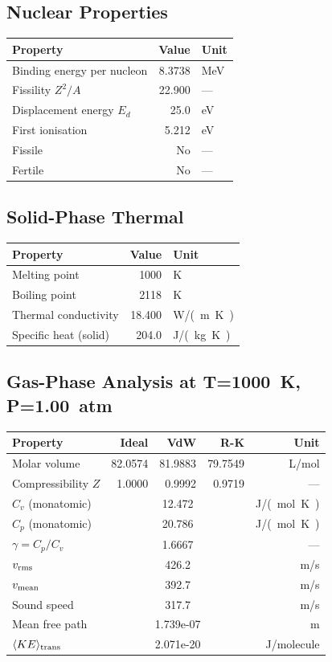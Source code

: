 \documentclass[11pt,a4paper]{article}
\begin{document}
\subsection{Nuclear Properties}
\begin{tabular}{lrl}
  \toprule
  Property & Value & Unit \\
  \midrule
  Binding energy per nucleon & 8.3738 & \si{MeV} \\
  Fissility $Z^2/A$ & 22.900 & --- \\
  Displacement energy $E_d$ & 25.0 & \si{eV} \\
  First ionisation & 5.212 & \si{eV} \\
  Fissile & No & --- \\
  Fertile & No & --- \\
  \bottomrule
\end{tabular}

\subsection{Solid-Phase Thermal}
\begin{tabular}{lrl}
  \toprule
  Property & Value & Unit \\
  \midrule
  Melting point & 1000 & \si{K} \\
  Boiling point & 2118 & \si{K} \\
  Thermal conductivity & 18.400 & \si{W/(m.K)} \\
  Specific heat (solid) & 204.0 & \si{J/(kg.K)} \\
  \bottomrule
\end{tabular}

\subsection{Gas-Phase Analysis at T=\SI{1000}{K}, P=\SI{1.00}{atm}}
\begin{tabular}{lrrrr}
  \toprule
  Property & Ideal & VdW & R-K & Unit \\
  \midrule
  Molar volume & 82.0574 & 81.9883 & 79.7549 & \si{L/mol} \\
  Compressibility $Z$ & 1.0000 & 0.9992 & 0.9719 & --- \\
  \midrule
  $C_v$ (monatomic) & \multicolumn{3}{c}{12.472} & \si{J/(mol.K)} \\
  $C_p$ (monatomic) & \multicolumn{3}{c}{20.786} & \si{J/(mol.K)} \\
  $\gamma = C_p/C_v$ & \multicolumn{3}{c}{1.6667} & --- \\
  $v_{\rm rms}$ & \multicolumn{3}{c}{426.2} & \si{m/s} \\
  $v_{\rm mean}$ & \multicolumn{3}{c}{392.7} & \si{m/s} \\
  Sound speed & \multicolumn{3}{c}{317.7} & \si{m/s} \\
  Mean free path & \multicolumn{3}{c}{1.739e-07} & \si{m} \\
  $\langle KE \rangle_{\rm trans}$ & \multicolumn{3}{c}{2.071e-20} & \si{J/molecule} \\
  \bottomrule
\end{tabular}
\end{document}
